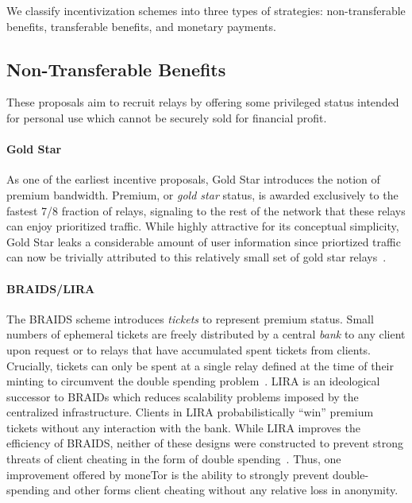 We classify incentivization schemes into three types of strategies:
non-transferable benefits, transferable benefits, and monetary
payments.



\subsection{Non-Transferable Benefits}

These proposals aim to recruit relays by offering some privileged status
intended for personal use which cannot be securely sold for financial profit.

\paragraph*{Gold Star} As one of the earliest incentive proposals, Gold Star
introduces the notion of premium bandwidth. Premium, or \emph{gold star} status,
is awarded exclusively to the fastest 7/8 fraction of relays, signaling to the
rest of the network that these relays can enjoy prioritized traffic. While
highly attractive for its conceptual simplicity, Gold Star leaks a considerable
amount of user information since priortized traffic can now be trivially
attributed to this relatively small set of gold star
relays~\cite{dingledine2010building}.

\paragraph*{BRAIDS/LIRA} The BRAIDS scheme introduces \emph{tickets} to represent
premium status. Small numbers of ephemeral tickets are freely distributed by a
central \emph{bank} to any client upon request or to relays that have
accumulated spent tickets from clients. Crucially, tickets can only be spent at
a single relay defined at the time of their minting to circumvent the double
spending problem~\cite{jansen2010recruiting}. LIRA is an ideological successor
to BRAIDs which reduces scalability problems imposed by the centralized
infrastructure. Clients in LIRA probabilistically ``win'' premium tickets
without any interaction with the bank. While LIRA improves the efficiency of
BRAIDS, neither of these designs were constructed to prevent strong threats of
client cheating in the form of double spending~\cite{jansen2013lira}. Thus, one
improvement offered by moneTor is the ability to strongly prevent
double-spending and other forms client cheating without any relative loss in
anonymity.

